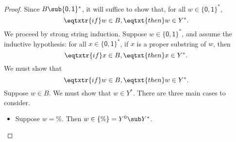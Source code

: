 \begin{proof}
Since $B\sub\{\mathsf{0,1}\}^*$, it will suffice to show that, for
all $w\in\{\mathsf{0,1}\}^*$,
\begin{displaymath}
\eqtxtr{if}w\in B,\eqtxt{then}w\in Y^* .
\end{displaymath}
We proceed by strong string induction.  Suppose
$w\in\{\mathsf{0,1}\}^*$, and assume the inductive hypothesis: for all
$x\in \{\mathsf{0,1}\}^*$, if $x$ is a proper substring of $w$, then
\begin{displaymath}
\eqtxtr{if}x\in B,\eqtxt{then}x\in Y^* .
\end{displaymath}
We must show that
\begin{displaymath}
\eqtxtr{if}w\in B,\eqtxt{then}w\in Y^* .
\end{displaymath}
Suppose $w\in B$.  We must show that $w\in Y^*$.
There are three main cases to consider.
\begin{itemize}
\item Suppose $w=\%$.  Then $w\in\{\%\}=Y^0\sub Y^*$.


\end{itemize}
\end{proof}

